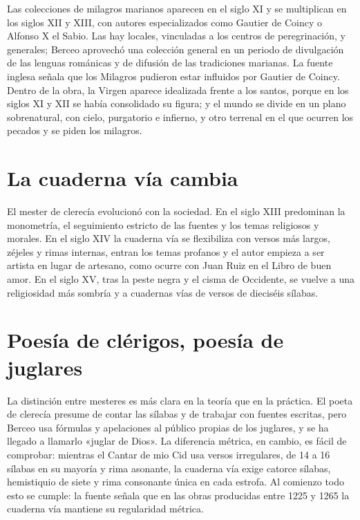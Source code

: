 \documentclass{book}
\begin{document}
Las colecciones de milagros marianos aparecen en el siglo XI y se multiplican en los siglos XII y XIII, con autores especializados como Gautier de Coincy o Alfonso X el Sabio. Las hay locales, vinculadas a los centros de peregrinación, y generales; Berceo aprovechó una colección general en un periodo de divulgación de las lenguas románicas y de difusión de las tradiciones marianas. La fuente inglesa señala que los Milagros pudieron estar influidos por Gautier de Coincy. Dentro de la obra, la Virgen aparece idealizada frente a los santos, porque en los siglos XI y XII se había consolidado su figura; y el mundo se divide en un plano sobrenatural, con cielo, purgatorio e infierno, y otro terrenal en el que ocurren los pecados y se piden los milagros.


\section{La cuaderna vía cambia}

El mester de clerecía evolucionó con la sociedad. En el siglo XIII predominan la monometría, el seguimiento estricto de las fuentes y los temas religiosos y morales. En el siglo XIV la cuaderna vía se flexibiliza con versos más largos, zéjeles y rimas internas, entran los temas profanos y el autor empieza a ser artista en lugar de artesano, como ocurre con Juan Ruiz en el Libro de buen amor. En el siglo XV, tras la peste negra y el cisma de Occidente, se vuelve a una religiosidad más sombría y a cuadernas vías de versos de dieciséis sílabas.


\section{Poesía de clérigos, poesía de juglares}

La distinción entre mesteres es más clara en la teoría que en la práctica. El poeta de clerecía presume de contar las sílabas y de trabajar con fuentes escritas, pero Berceo usa fórmulas y apelaciones al público propias de los juglares, y se ha llegado a llamarlo «juglar de Dios». La diferencia métrica, en cambio, es fácil de comprobar: mientras el Cantar de mio Cid usa versos irregulares, de 14 a 16 sílabas en su mayoría y rima asonante, la cuaderna vía exige catorce sílabas, hemistiquio de siete y rima consonante única en cada estrofa. Al comienzo todo esto se cumple: la fuente señala que en las obras producidas entre 1225 y 1265 la cuaderna vía mantiene su regularidad métrica.
\end{document}
